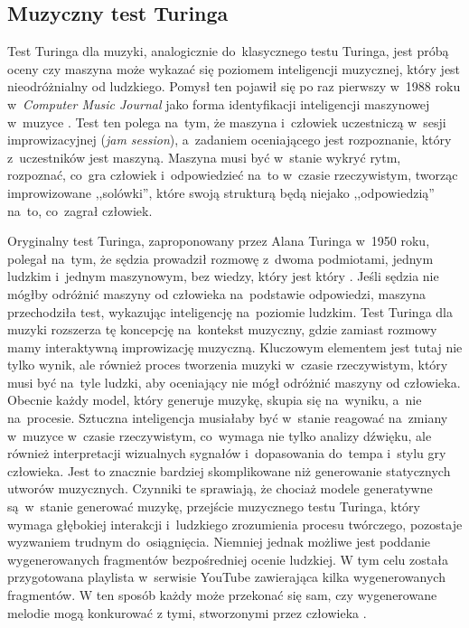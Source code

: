 \documentclass[data-science]{agh-wi} %
\begin{document}
\subsection{Muzyczny test Turinga}
Test Turinga dla muzyki, analogicznie do~klasycznego testu Turinga, jest próbą oceny czy maszyna może wykazać się poziomem inteligencji muzycznej, który jest nieodróżnialny od ludzkiego. Pomysł ten pojawił się po raz pierwszy w~1988 roku w~\textit{Computer Music Journal} jako forma identyfikacji inteligencji maszynowej w~muzyce \cite{music_turing_test}. Test ten polega na~tym, że maszyna i~człowiek uczestniczą w~sesji improwizacyjnej (\textit{jam session}), a~zadaniem oceniającego jest rozpoznanie, który z~uczestników jest maszyną. Maszyna musi być w~stanie wykryć rytm, rozpoznać, co~gra człowiek i~odpowiedzieć na~to w~czasie rzeczywistym, tworząc improwizowane ,,solówki'', które swoją strukturą będą niejako ,,odpowiedzią'' na~to, co~zagrał człowiek.

Oryginalny test Turinga, zaproponowany przez Alana Turinga w~1950 roku, polegał na~tym, że sędzia prowadził rozmowę z~dwoma podmiotami, jednym ludzkim i~jednym maszynowym, bez wiedzy, który jest który \cite{turing_test}. Jeśli sędzia nie mógłby odróżnić maszyny od człowieka na~podstawie odpowiedzi, maszyna przechodziła test, wykazując inteligencję na~poziomie ludzkim. Test Turinga dla muzyki rozszerza tę koncepcję na~kontekst muzyczny, gdzie zamiast rozmowy mamy interaktywną improwizację muzyczną. Kluczowym elementem jest tutaj nie tylko wynik, ale również proces tworzenia muzyki w~czasie rzeczywistym, który musi być na~tyle ludzki, aby oceniający nie mógł odróżnić maszyny od człowieka. Obecnie każdy model, który generuje muzykę, skupia się na~wyniku, a~nie na~procesie. Sztuczna inteligencja musiałaby być w~stanie reagować na~zmiany w~muzyce w~czasie rzeczywistym, co~wymaga nie tylko analizy dźwięku, ale również interpretacji wizualnych sygnałów i~dopasowania do~tempa i~stylu gry człowieka. Jest to znacznie bardziej skomplikowane niż generowanie statycznych utworów muzycznych. Czynniki te sprawiają, że chociaż modele generatywne są~w~stanie generować muzykę, przejście muzycznego testu Turinga, który wymaga głębokiej interakcji i~ludzkiego zrozumienia procesu twórczego, pozostaje wyzwaniem trudnym do~osiągnięcia. Niemniej jednak możliwe jest poddanie wygenerowanych fragmentów bezpośredniej ocenie ludzkiej. W tym celu została przygotowana playlista w~serwisie YouTube zawierająca kilka wygenerowanych fragmentów. W ten sposób każdy może przekonać się sam, czy wygenerowane melodie mogą konkurować z tymi, stworzonymi przez człowieka \cite*{playlist}.
\end{document}
